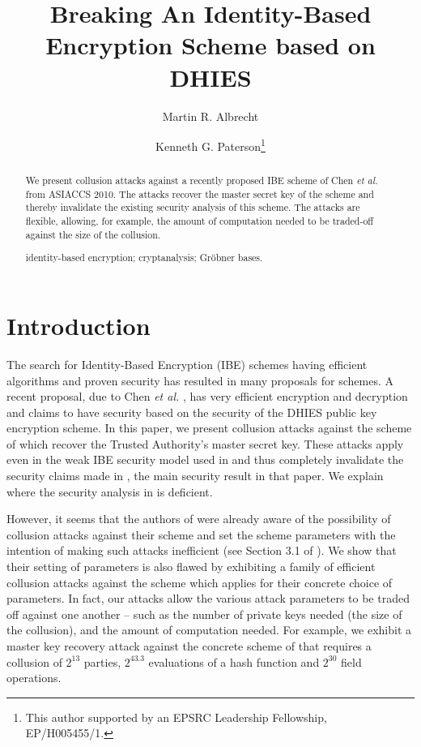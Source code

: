 \documentclass{llncs}
\title{Breaking An Identity-Based Encryption Scheme based on DHIES}
\author{Martin R. Albrecht\inst{1} \and Kenneth G. Paterson\inst{2}\thanks{This
author supported by an EPSRC Leadership Fellowship, EP/H005455/1.}}
\institute{INRIA, Paris-Rocquencourt Center, SALSA Project
UPMC Univ Paris 06, UMR 7606, LIP6, F-75005, Paris, France
CNRS, UMR 7606, LIP6, F-75005, Paris, France
\and Information Security Group, Royal Holloway, University of London.}
\begin{document}
\maketitle

\begin{abstract}
We present collusion attacks against a recently proposed IBE scheme of Chen {\em et al.} from ASIACCS 2010. The attacks recover the master secret key of the scheme and thereby invalidate the existing security analysis of this scheme. The attacks are flexible, allowing, for example, the amount of computation needed to be traded-off against the size of the collusion.

\vspace{0.1cm}

 identity-based encryption; cryptanalysis; Gr\"{o}bner bases.
\end{abstract}

\section{Introduction}

The search for Identity-Based Encryption (IBE) schemes having efficient algorithms and proven security has resulted in many proposals for schemes. A recent proposal, due to Chen {\em et al.} \cite{CCGHC10}, has very efficient encryption and decryption and claims to have security based on the security of the DHIES public key encryption scheme. In this paper, we present collusion attacks against the scheme of \cite{CCGHC10} which recover the Trusted Authority's master secret key. These attacks apply even in the weak IBE security model used in \cite{CCGHC10} and thus completely invalidate the security claims made in \cite[Theorem 3.1]{CCGHC10}, the main security result in that paper. We explain where the security analysis in \cite{CCGHC10} is deficient.

However, it seems that the authors of \cite{CCGHC10} were already aware of the possibility of collusion attacks against their scheme and set the scheme parameters with the intention of making such attacks inefficient (see Section 3.1 of \cite{CCGHC10}). We show that their setting of parameters is also flawed by exhibiting a family of efficient collusion attacks against the scheme which applies for their concrete choice of parameters. In fact, our attacks allow the various attack parameters to be traded off against one another -- such as the number of private keys needed (the size of the collusion), and the amount of computation needed. For example, we exhibit a master key recovery attack against the concrete scheme of \cite{CCGHC10} that requires a collusion of $2^{13}$ parties, $2^{43.3}$ evaluations of a hash function and $2^{30}$ field operations.
 
\end{document}
